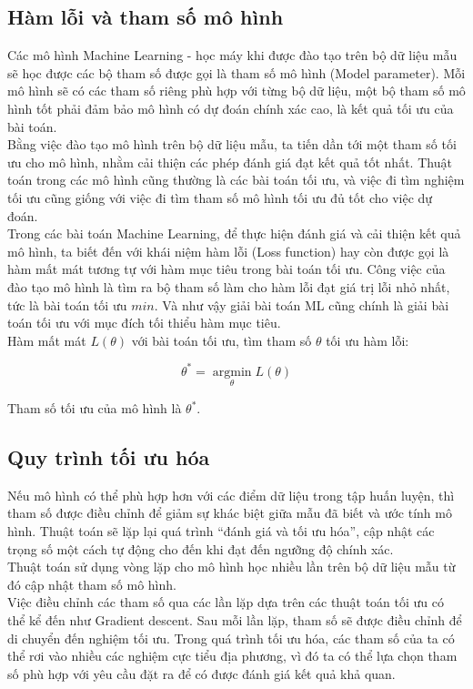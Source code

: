 \subsection{Hàm lỗi và tham số mô hình}
Các mô hình Machine Learning - học máy khi được đào tạo trên bộ dữ liệu mẫu sẽ học được các bộ tham số được gọi là tham số mô hình (Model parameter). Mỗi mô hình sẽ có các tham số riêng phù hợp với từng bộ dữ liệu, một bộ tham số mô hình tốt phải đảm bảo mô hình có dự đoán chính xác cao, là kết quả tối ưu của bài toán.\\
Bằng việc đào tạo mô hình trên bộ dữ liệu mẫu, ta tiến dần tới một tham số tối ưu cho mô hình, nhằm cải thiện các phép đánh giá đạt kết quả tốt nhất. Thuật toán trong các mô hình cũng thường là các bài toán tối ưu, và việc đi tìm nghiệm tối ưu cũng giống với việc đi tìm tham số mô hình tối ưu đủ tốt cho việc dự đoán.\\
Trong các bài toán Machine Learning, để thực hiện đánh giá và cải thiện kết quả mô hình, ta biết đến với khái niệm hàm lỗi (Loss function) hay còn được gọi là hàm mất mát tương tự với hàm mục tiêu trong bài toán tối ưu. Công việc của đào tạo mô hình là tìm ra bộ tham số làm cho hàm lỗi đạt giá trị lỗi nhỏ nhất, tức là bài toán tối ưu $min$. Và như vậy giải bài toán ML cũng chính là giải bài toán tối ưu với mục đích tối thiểu hàm mục tiêu.\\
Hàm mất mát $L(\theta)$ với bài toán tối ưu, tìm tham số $\theta$ tối ưu hàm lỗi:
\begin{center}
\begin{equation*}
    \theta^*  = \mathop {\arg \min }\limits_\theta  L(\theta )
\end{equation*}    
\end{center}
Tham số tối ưu của mô hình là $\theta^*$.

\subsection{Quy trình tối ưu hóa}
Nếu mô hình có thể phù hợp hơn với các điểm dữ liệu trong tập huấn luyện, thì tham số được điều chỉnh để giảm sự khác biệt giữa mẫu đã biết và ước tính mô hình. Thuật toán sẽ lặp lại quá trình “đánh giá và tối ưu hóa”, cập nhật các trọng số một cách tự động cho đến khi đạt đến ngưỡng độ chính xác.\\
Thuật toán sử dụng vòng lặp cho mô hình học nhiều lần trên bộ dữ liệu mẫu từ đó cập nhật tham số mô hình.\\ Việc điều chỉnh các tham số qua các lần lặp dựa trên các thuật toán tối ưu có thể kể đến như Gradient descent. Sau mỗi lần lặp, tham số sẽ được điều chỉnh để di chuyển đến nghiệm tối ưu. Trong quá trình tối ưu hóa, các tham số của ta có thể rơi vào nhiều  các nghiệm cực tiểu địa phương, vì đó ta có thể lựa chọn tham số phù hợp với yêu cầu đặt ra để có được đánh giá kết quả khả quan.

